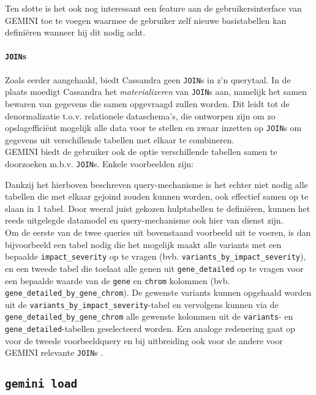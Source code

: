 Ten slotte is het ook nog interessant een feature aan de gebruikersinterface van GEMINI toe te voegen waarmee de gebruiker zelf nieuwe basistabellen kan defini\"eren wanneer hij dit nodig acht.

\paragraph{\texttt{JOIN}s}

Zoals eerder aangehaald, biedt Cassandra geen \texttt{JOIN}s in z'n querytaal. In de plaats moedigt Cassandra het \textit{materializeren} van \texttt{JOIN}s aan, namelijk het samen bewaren van gegevens die samen opgevraagd zullen worden. Dit leidt tot de denormalizatie t.o.v. relationele dataschema's, die ontworpen zijn om zo opslageffici\"ent mogelijk alle data voor te stellen en zwaar inzetten op \texttt{JOIN}s om gegevens uit verschillende tabellen met elkaar te combineren.\\
GEMINI biedt de gebruiker ook de optie verschillende tabellen samen te doorzoeken m.b.v. \texttt{JOIN}s. Enkele voorbeelden zijn:



Dankzij het hierboven beschreven query-mechanisme is het echter niet nodig alle tabellen die met elkaar gejoind zouden kunnen worden, ook effectief samen op te slaan in 1 tabel. Door weeral juist gekozen hulptabellen te defini\"eren, kunnen het reeds uitgelegde datamodel en query-mechanisme ook hier van dienst zijn.\\
Om de eerste van de twee queries uit bovenstaand voorbeeld uit te voeren, is dan bijvoorbeeld een tabel nodig die het mogelijk maakt alle variants met een bepaalde \texttt{impact\_severity} op te vragen (bvb. \texttt{variants\_by\_impact\_severity}), en een tweede tabel die toelaat alle genen uit \texttt{gene\_detailed} op te vragen voor een bepaalde waarde van de \texttt{gene} en \texttt{chrom} kolommen (bvb. \texttt{gene\_detailed\_by\_gene\_chrom}). De gewenste variants kunnen opgehaald worden uit de \texttt{variants\_by\_impact\_severity}-tabel en vervolgens kunnen via de \texttt{gene\_detailed\_by\_gene\_chrom} alle gewenste kolommen uit de \texttt{variants}- en \texttt{gene\_detailed}-tabellen geselecteerd worden. Een analoge redenering gaat op voor de tweede voorbeeldquery en bij uitbreiding ook voor de andere voor GEMINI relevante \texttt{JOIN}s \cite{gemini_joins}.

\subsection{\texttt{gemini load}}

